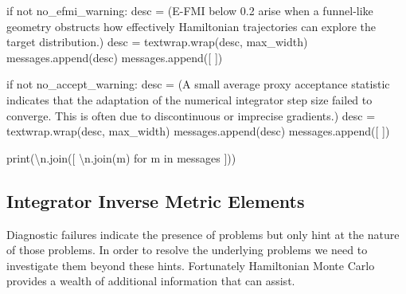 \documentclass[
  letterpaper,
  DIV=11,
  numbers=noendperiod]{scrartcl}
\newenvironment{Shaded}{\begin{snugshade}}{\end{snugshade}}
\newcommand{\BuiltInTok}[1]{\textcolor[rgb]{0.00,0.23,0.31}{#1}}
\newcommand{\CharTok}[1]{\textcolor[rgb]{0.13,0.47,0.30}{#1}}
\newcommand{\ControlFlowTok}[1]{\textcolor[rgb]{0.00,0.23,0.31}{#1}}
\newcommand{\KeywordTok}[1]{\textcolor[rgb]{0.00,0.23,0.31}{#1}}
\newcommand{\NormalTok}[1]{\textcolor[rgb]{0.00,0.23,0.31}{#1}}
\newcommand{\OperatorTok}[1]{\textcolor[rgb]{0.37,0.37,0.37}{#1}}
\newcommand{\StringTok}[1]{\textcolor[rgb]{0.13,0.47,0.30}{#1}}
\begin{document}
\begin{Shaded}
\begin{Highlighting}[]
  \ControlFlowTok{if} \KeywordTok{not}\NormalTok{ no\_efmi\_warning:}
\NormalTok{    desc }\OperatorTok{=}\NormalTok{ (}\StringTok{\textquotesingle{}E{-}FMI below 0.2 arise when a funnel{-}like geometry \textquotesingle{}}
            \StringTok{\textquotesingle{}obstructs how effectively Hamiltonian trajectories \textquotesingle{}}
            \StringTok{\textquotesingle{}can explore the target distribution.\textquotesingle{}}\NormalTok{)}
\NormalTok{    desc }\OperatorTok{=}\NormalTok{ textwrap.wrap(desc, max\_width)}
\NormalTok{    messages.append(desc)}
\NormalTok{    messages.append([}\StringTok{\textquotesingle{} \textquotesingle{}}\NormalTok{])}
  
  \ControlFlowTok{if} \KeywordTok{not}\NormalTok{ no\_accept\_warning:}
\NormalTok{    desc }\OperatorTok{=}\NormalTok{ (}\StringTok{\textquotesingle{}A small average proxy acceptance statistic \textquotesingle{}}
            \StringTok{\textquotesingle{}indicates that the adaptation of the numerical \textquotesingle{}}
            \StringTok{\textquotesingle{}integrator step size failed to converge.  This is \textquotesingle{}}
            \StringTok{\textquotesingle{}often due to discontinuous or imprecise \textquotesingle{}}
            \StringTok{\textquotesingle{}gradients.\textquotesingle{}}\NormalTok{)}
\NormalTok{    desc }\OperatorTok{=}\NormalTok{ textwrap.wrap(desc, max\_width)}
\NormalTok{    messages.append(desc)}
\NormalTok{    messages.append([}\StringTok{\textquotesingle{} \textquotesingle{}}\NormalTok{])}
  
  \BuiltInTok{print}\NormalTok{(}\StringTok{\textquotesingle{}}\CharTok{\textbackslash{}n}\StringTok{\textquotesingle{}}\NormalTok{.join([ }\StringTok{\textquotesingle{}}\CharTok{\textbackslash{}n}\StringTok{\textquotesingle{}}\NormalTok{.join(m) }\ControlFlowTok{for}\NormalTok{ m }\KeywordTok{in}\NormalTok{ messages ]))}
\end{Highlighting}
\end{Shaded}

\subsection{Integrator Inverse Metric
Elements}\label{integrator-inverse-metric-elements}

Diagnostic failures indicate the presence of problems but only hint at
the nature of those problems. In order to resolve the underlying
problems we need to investigate them beyond these hints. Fortunately
Hamiltonian Monte Carlo provides a wealth of additional information that
can assist.
\end{document}
